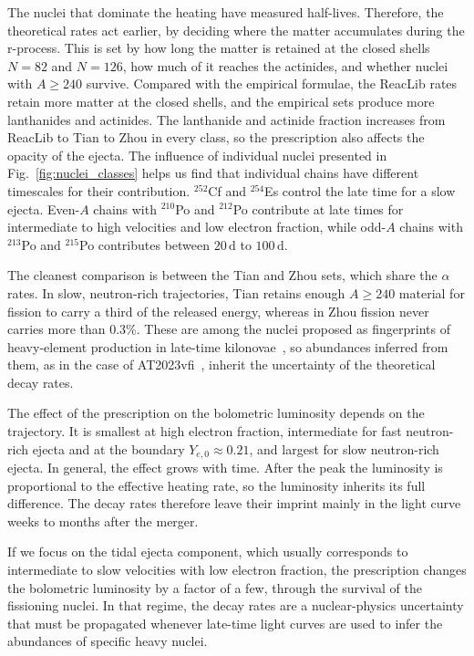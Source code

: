 The nuclei that dominate the heating have measured half-lives.
Therefore, the theoretical rates act earlier, by deciding where the matter accumulates during the r-process.
This is set by how long the matter is retained at the closed shells $N=82$ and $N=126$, how much of it reaches the actinides, and whether nuclei with $A\geq240$ survive.
Compared with the empirical formulae, the ReacLib rates retain more matter at the closed shells, and the empirical sets produce more lanthanides and actinides.
The lanthanide and actinide fraction increases from ReacLib to Tian to Zhou in every class, so the prescription also affects the opacity of the ejecta.
The influence of individual nuclei presented in Fig.~\ref{fig:nuclei_classes} helps us find that individual chains have different timescales for their contribution.
${}^{252}$Cf and ${}^{254}$Es control the late time for a slow ejecta.
Even-$A$ chains with ${}^{210}$Po and ${}^{212}$Po contribute at late times for intermediate to high velocities and low electron fraction, while odd-$A$ chains with ${}^{213}$Po and ${}^{215}$Po contributes between $20\,\mathrm{d}$ to $100\,\mathrm{d}$.

The cleanest comparison is between the Tian and Zhou sets, which share the $\alpha$ rates.
In slow, neutron-rich trajectories, Tian retains enough $A\geq240$ material for fission to carry a third of the released energy, whereas in Zhou fission never carries more than $0.3\%$.
These are among the nuclei proposed as fingerprints of heavy-element production in late-time kilonovae~\cite{wu_fingerprints_2019,chen_radioactive_2023}, so abundances inferred from them, as in the case of AT2023vfi~\cite{liu_constraint_2025}, inherit the uncertainty of the theoretical decay rates.

The effect of the prescription on the bolometric luminosity depends on the trajectory.
It is smallest at high electron fraction, intermediate for fast neutron-rich ejecta and at the boundary $Y_{e,0}\approx0.21$, and largest for slow neutron-rich ejecta.
In general, the effect grows with time.
After the peak the luminosity is proportional to the effective heating rate, so the luminosity inherits its full difference.
The decay rates therefore leave their imprint mainly in the light curve weeks to months after the merger.

If we focus on the tidal ejecta component, which usually corresponds to intermediate to slow velocities with low electron fraction, the prescription changes the bolometric luminosity by a factor of a few, through the survival of the fissioning nuclei.
In that regime, the decay rates are a nuclear-physics uncertainty that must be propagated whenever late-time light curves are used to infer the abundances of specific heavy nuclei.

